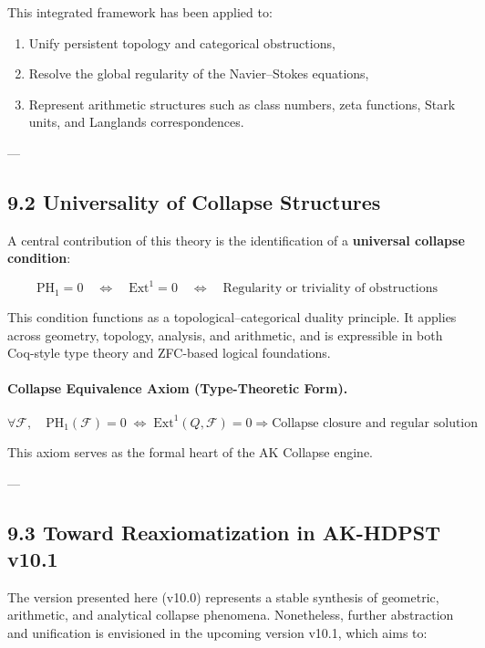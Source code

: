 \documentclass[11pt]{article}
\begin{document}
This integrated framework has been applied to:
\begin{enumerate}
  \item Unify persistent topology and categorical obstructions,
  \item Resolve the global regularity of the Navier–Stokes equations,
  \item Represent arithmetic structures such as class numbers, zeta functions, Stark units, and Langlands correspondences.
\end{enumerate}

---

\subsection*{9.2 Universality of Collapse Structures}

A central contribution of this theory is the identification of a \textbf{universal collapse condition}:

\[
\mathrm{PH}_1 = 0 \quad \Leftrightarrow \quad \mathrm{Ext}^1 = 0 \quad \Leftrightarrow \quad \text{Regularity or triviality of obstructions}
\]

This condition functions as a topological–categorical duality principle.  
It applies across geometry, topology, analysis, and arithmetic, and is expressible in both Coq-style type theory and ZFC-based logical foundations.

\paragraph{Collapse Equivalence Axiom (Type-Theoretic Form).}
\[
\forall \mathcal{F}, \quad \mathrm{PH}_1(\mathcal{F}) = 0 \;\Leftrightarrow\; \mathrm{Ext}^1(Q, \mathcal{F}) = 0
\Rightarrow \text{Collapse closure and regular solution}
\]

This axiom serves as the formal heart of the AK Collapse engine.

---

\subsection*{9.3 Toward Reaxiomatization in AK-HDPST v10.1}

The version presented here (v10.0) represents a stable synthesis of geometric, arithmetic, and analytical collapse phenomena.  
Nonetheless, further abstraction and unification is envisioned in the upcoming version v10.1, which aims to:
\end{document}
